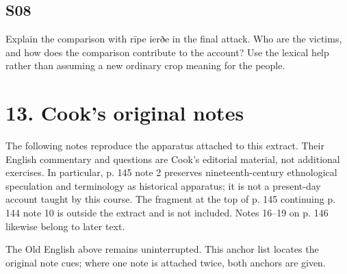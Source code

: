 \subsection*{S08}

\par\begin{minipage}{\linewidth}\raggedright
Explain the comparison with rīpe ierðe in the final attack. Who are the victims, and how does the comparison contribute to the account? Use the lexical help rather than assuming a new ordinary crop meaning for the people.

\end{minipage}\par\addvspace{4pt}

\section*{13. Cook’s original notes}

\begingroup\fontsize{10}{12.8}\selectfont
\setlength{\parskip}{1.5pt}
The following notes reproduce the apparatus attached to this extract. Their English commentary and questions are Cook’s editorial material, not additional exercises. In particular, p. 145 note 2 preserves nineteenth-century ethnological speculation and terminology as historical apparatus; it is not a present-day account taught by this course. The fragment at the top of p. 145 continuing p. 144 note 10 is outside the extract and is not included. Notes 16–19 on p. 146 likewise belong to later text.

The Old English above remains uninterrupted. This anchor list locates the original note cues; where one note is attached twice, both anchors are given.

